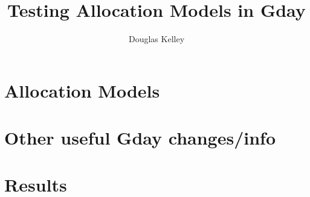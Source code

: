 \documentclass[]{report}
\title{Testing Allocation Models in Gday}
\author{Douglas Kelley}
\begin{document}


\tableofcontents
\listoffigures
\listoftables



\chapter{Allocation Models}





\chapter{Other useful Gday changes/info}



\chapter{Results}




\end{document}

